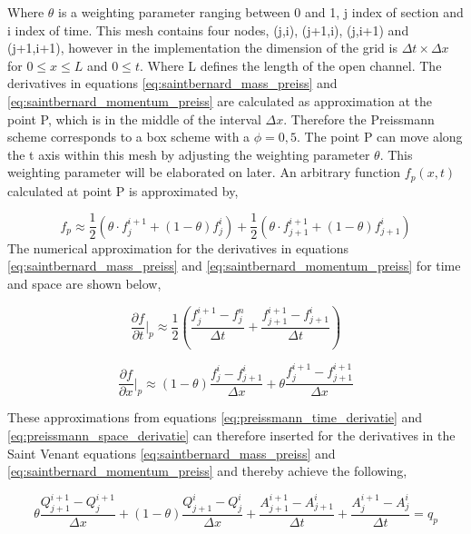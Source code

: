 Where $\theta$ is a weighting parameter ranging between 0 and 1, j index of section and i index of time. This mesh contains four nodes, (j,i), (j+1,i), (j,i+1) and (j+1,i+1), however in the implementation the dimension of the grid is $\Delta t \times \Delta x$ for $0 \leq x \leq L$ and $0\leq t$. Where L defines the length of the open channel. The derivatives in equations \ref{eq:saintbernard_mass_preiss} and \ref{eq:saintbernard_momentum_preiss} are calculated as approximation at the point P, which is in the middle of the interval $\Delta x$. Therefore the Preissmann scheme corresponds to a box scheme with a $\phi =0,5$. The point P can move along the t axis within this mesh by adjusting the weighting parameter $\theta$. This weighting parameter will be elaborated on later. An arbitrary function $f_p(x,t)$ calculated at point P is approximated by, 

\begin{equation}\label{eq:approximated_function}
	f_p \approx \frac{1}{2} (\theta \cdot f_j^{i+1}+(1-\theta)f_j^i)+\frac{1}{2}(\theta\cdot f_{j+1}^{i+1}+(1-\theta)f_{j+1}^i)
\end{equation}
The numerical approximation for the derivatives in equations \ref{eq:saintbernard_mass_preiss} and \ref{eq:saintbernard_momentum_preiss} for time and space are shown below, 

\begin{equation}\label{eq:preissmann_time_derivatie}
	\frac{\partial f}{\partial t}\bigg \rvert_p \approx \frac{1}{2}\left(\frac{f_j^{i+1}-f_j^n}{\Delta t}+\frac{f_{j+1}^{i+1}-f_{j+1}^i}{\Delta t}\right)
\end{equation}

\begin{equation}\label{eq:preissmann_space_derivatie}
	\frac{\partial f}{\partial x}\bigg \rvert_p \approx (1-\theta)\frac{f_j^i-f_{j+1}^i}{\Delta x}+\theta \frac{f_j^{i+1}-f_{j+1}^{i+1}}{\Delta x}
\end{equation}

These approximations from equations \ref{eq:preissmann_time_derivatie} and \ref{eq:preissmann_space_derivatie} can therefore inserted for the derivatives in the Saint Venant equations \ref{eq:saintbernard_mass_preiss} and \ref{eq:saintbernard_momentum_preiss} and thereby achieve the following, 

\begin{equation}\label{eq:continuity_eq_preissmann}
	\theta \frac{Q_{j+1}^{i+1}-Q_j^{i+1}}{\Delta x}+(1-\theta)\frac{Q_{j+1}^i - Q_j^i}{\Delta x}+
	\frac{A_{j+1}^{i+1}-A_{j+1}^i}{\Delta t}+\frac{A_{j}^{i+1} - A_j^i}{\Delta t} = q_p
\end{equation}

